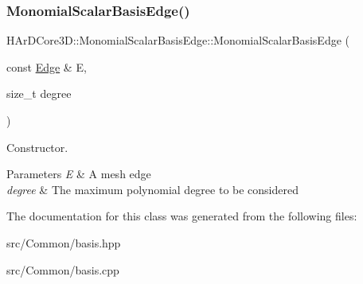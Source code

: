 \subsubsection{\texorpdfstring{Monomial\+Scalar\+Basis\+Edge()}{MonomialScalarBasisEdge()}}
{\footnotesize\ttfamily H\+Ar\+D\+Core3\+D\+::\+Monomial\+Scalar\+Basis\+Edge\+::\+Monomial\+Scalar\+Basis\+Edge (\begin{DoxyParamCaption}\item[{const \hyperlink{classHArDCore3D_1_1Edge}{Edge} \&}]{E,  }\item[{size\+\_\+t}]{degree }\end{DoxyParamCaption})}



Constructor. 


\begin{DoxyParams}{Parameters}
{\em E} & A mesh edge \\
\hline
{\em degree} & The maximum polynomial degree to be considered \\
\hline
\end{DoxyParams}


The documentation for this class was generated from the following files\+:\begin{DoxyCompactItemize}
\item 
src/\+Common/basis.\+hpp\item 
src/\+Common/basis.\+cpp\end{DoxyCompactItemize}
